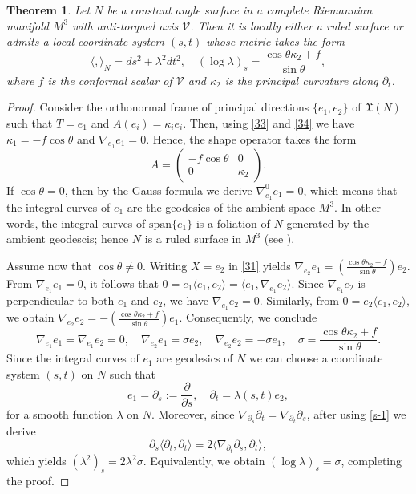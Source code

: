 \documentclass[12pt]{amsart}
\def\v{\mathcal V}
\def\x{\mathfrak X}
\newtheorem{theorem}{Theorem}[section]
\theoremstyle{definition}
\begin{document}
\begin{theorem} \label{ts1}
Let $N$ be a constant angle surface in a complete Riemannian manifold $ M^3$ with anti-torqued axis $\v$. Then it is locally either a ruled surface or admits a local coordinate system $(s,t)$ whose metric takes the form 
\begin{equation}
\langle,\rangle_N=ds^2+\lambda^2dt^2, \quad (\log \lambda)_s=\frac{\cos\theta\kappa_2+f}{\sin\theta}, \label{tw}
\end{equation}
where $f$ is the conformal scalar of $\v$ and $\kappa_2$ is the principal curvature along $ \partial_t$.
\end{theorem}
\begin{proof}
Consider the orthonormal frame of principal directions $\{e_1,e_2\}$ of $\x(N)$ such that $T=e_1$ and $A(e_i)=\kappa_ie_i$. Then, using \eqref{33} and \eqref{34} we have $\kappa_1=-f\cos\theta $ and $\nabla_{e_1}e_1 =0.$ Hence, the shape operator takes the form
$$
A=\begin{pmatrix}
-f\cos\theta&0  \\ 
0& \kappa_2
\end{pmatrix}.%
$$
If $\cos\theta=0$, then by the Gauss formula we derive $\nabla^0_{e_1}e_1=0$, which means that the integral curves of $e_1$ are the geodesics of the ambient space $M^3$. In other words, the integral curves of $\mbox{span}\{e_1\}$ is a foliation of $N$ generated by the ambient geodescis; hence $N$ is a ruled surface in $M^3$ (see \cite{lrs}). 

Assume now that $\cos\theta\neq0$. Writing $X=e_2$ in \eqref{31} yields $\nabla_{e_2}e_1 =(\frac{\cos\theta\kappa_2 +f}{\sin\theta})e_2. $ From $\nabla_{e_1}e_1 =0$, it follows that $0=e_1 \langle e_1,e_2\rangle=\langle e_1,\nabla_{e_1}e_2 \rangle.$ Since $\nabla_{e_1}e_2$ is perpendicular to both $e_1$ and $e_2$, we have $\nabla_{e_1}e_2=0$. Similarly, from $0=e_2 \langle e_1,e_2\rangle$, we obtain $\nabla_{e_2}e_2 =-(\frac{\cos\theta\kappa_2 +f}{\sin\theta})e_1. $ Consequently, we conclude
\begin{equation}
\nabla_{e_1}e_1 =\nabla_{e_1}e_2=0, \quad \nabla_{e_2}e_1 =\sigma e_2, \quad \nabla_{e_2}e_2 =-\sigma e_1, \quad \sigma=\frac{\cos\theta\kappa_2 +f}{\sin\theta}. \label{s-1}
\end{equation}
Since the integral curves of $e_1$ are geodesics of $N$ we can choose a coordinate system $(s,t)$ on $N$ such that 
\begin{equation*} 
e_1=\partial_s:=\frac{\partial }{\partial s}, \quad \partial_t=\lambda(s,t)e_2,
\end{equation*}
for a smooth function $\lambda$ on $N$. Moreover, since $\nabla_{\partial_s}\partial_t=\nabla_{\partial_t}\partial_s$, after using \eqref{s-1} we derive
$$
\partial_s\langle \partial_t,\partial_t\rangle=2\langle \nabla_{\partial_t}\partial_s,\partial_t\rangle,
$$
which yields $(\lambda^2)_s=2\lambda^2\sigma$. Equivalently, we obtain $(\log \lambda)_s=\sigma$, completing the proof.
\end{proof}
\end{document}
